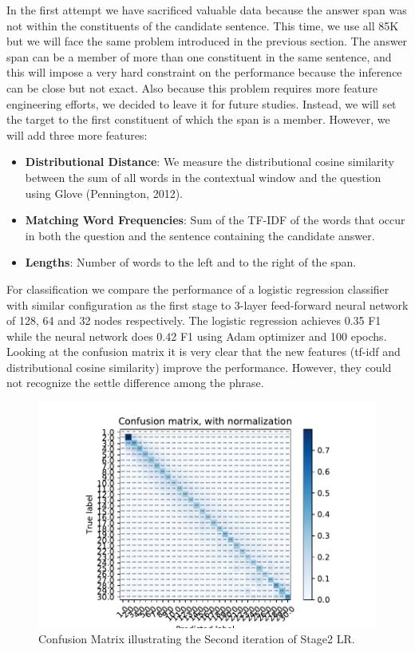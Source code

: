In the first attempt we have sacrificed valuable data because the answer span was not within the constituents of the candidate sentence. This time, we use all 85K but we will face the same problem introduced in the previous section. The answer span can be a member of more than one constituent in the same sentence, and this will impose a very hard constraint on the performance because the inference can be close but not exact. Also because this problem requires more feature engineering efforts, we decided to leave it for future studies. Instead, we will set the target to the first constituent of which the span is a member. However, we will add three more features:

\begin{itemize}
\item \textbf{Distributional Distance}: We measure the distributional cosine similarity between the sum of all words in the contextual window and the question using Glove (Pennington, 2012). 

\item \textbf{Matching Word Frequencies}: Sum of the TF-IDF of the words that occur in both the question and the sentence containing the candidate answer.

\item \textbf{Lengths}: Number of words to the left and to the right of the span.
\end{itemize}

For classification we compare the performance of a logistic regression classifier with similar configuration as the first stage to 3-layer feed-forward neural network of 128, 64 and 32 nodes respectively. The logistic regression achieves 0.35 F1 while the neural network does 0.42 F1 using Adam optimizer and 100 epochs. Looking at the confusion matrix it is very clear that the new features (tf-idf and distributional cosine similarity) improve the performance. However, they could not recognize the settle difference among the phrase.  \\


\begin{figure}
  \includegraphics[scale=1]{../Figures/fig_1.pdf} 
  \caption{Confusion Matrix illustrating the Second iteration of Stage2 LR. }
\end{figure} 


